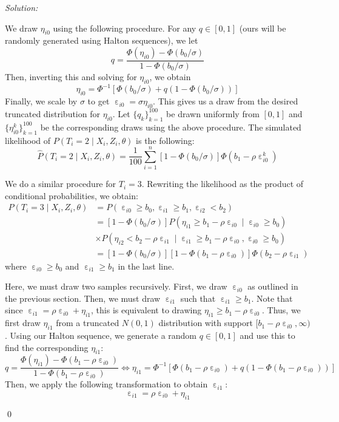 \documentclass[12pt]{article}
\DeclareMathOperator{\eps}{\varepsilon}
\newenvironment{sol}
    {\emph{Solution:}
    }
    {
    \qed
    }
\begin{document}
\begin{sol}
    We draw $\eta_{i0}$ using the following procedure. For any $q \in [0,1]$ (ours will be randomly generated using Halton sequences), we let
    \[q = \frac{\Phi(\eta_{i0}) - \Phi(b_0/\sigma)}{1 - \Phi(b_0/\sigma)} \]
    Then, inverting this and solving for $\eta_{i0}$, we obtain
    \[\eta_{i0} = \Phi^{-1}[\Phi(b_0/\sigma) + q (1-\Phi(b_0/\sigma))]\]
    Finally, we scale by $\sigma$ to get $\eps_{i0} = \sigma \eta_{i0}$. This gives us a draw from the desired truncated distribution for $\eta_{i0}$. Let $\{q_k\}_{k=1}^{100}$ be drawn uniformly from $[0,1]$ and $ \{\eta_{i0}^k\}_{k=1}^{100}$ be the corresponding draws using the above procedure. The simulated likelihood of $P(T_i = 2 \mid X_i, Z_i, \theta)$ is the following:
    \[\hat{P}(T_i = 2 \mid X_i, Z_i, \theta) = \frac{1}{100} \sum_{i=1}^n [1-\Phi(b_0/\sigma)] \Phi(b_1 - \rho \eps_{i0}^k) \]
    
    We do a similar procedure for $T_i = 3$. Rewriting the likelihood as the product of conditional probabilities, we obtain:
    \begin{align*}
        P(T_i = 3  \mid X_i, Z_i, \theta)  &= P( \eps_{i0} \geq b_0,  \eps_{i1} \geq b_1, \eps_{i2} < b_2) \\
        &= [1-\Phi(b_0/\sigma)] P(\eta_{i1} \geq b_1 - \rho \eps_{i0} \mid \eps_{i0} \geq b_0) \\
        &\times P(\eta_{i2} < b_2 - \rho \eps_{i1} \mid \eps_{i1} \geq b_1- \rho \eps_{i0}, \eps_{i0} \geq b_0 )\\
        &= [1-\Phi(b_0/\sigma)] [1 - \Phi(b_1 - \rho \eps_{i0})] \Phi(b_2 - \rho \eps_{i1})
    \end{align*}
    where $\eps_{i0} \geq b_0$ and $\eps_{i1} \geq b_1$ in the last line.    
    
    Here, we must draw two samples recursively. First, we draw $\eps_{i0}$ as outlined in the previous section. Then, we must draw $\eps_{i1}$ such that $\eps_{i1} \geq b_1$. Note that since $\eps_{i1} = \rho \eps_{i0} + \eta_{i1}$, this is equivalent to drawing $\eta_{i1} \geq b_1 - \rho \eps_{i0}$. Thus, we first draw $\eta_{i1}$ from a truncated $N(0,1)$ distribution with support $[b_1 - \rho \eps_{i0}, \infty)$. Using our Halton sequence, we generate a random $q \in [0,1]$ and use this to find the corresponding $\eta_{i1}$:
    \[q = \frac{\Phi(\eta_{i1}) - \Phi(b_1 - \rho \eps_{i0})}{1 - \Phi(b_1 - \rho \eps_{i0})} \iff \eta_{i1} =  \Phi^{-1}[\Phi(b_1 - \rho \eps_{i0}) + q (1-\Phi(b_1 - \rho \eps_{i0}))]\]
    Then, we apply the following transformation to obtain $\eps_{i1}$:
    \[\eps_{i1} = \rho \eps_{i0} + \eta_{i1}\]
    

\end{sol}
\end{document}
